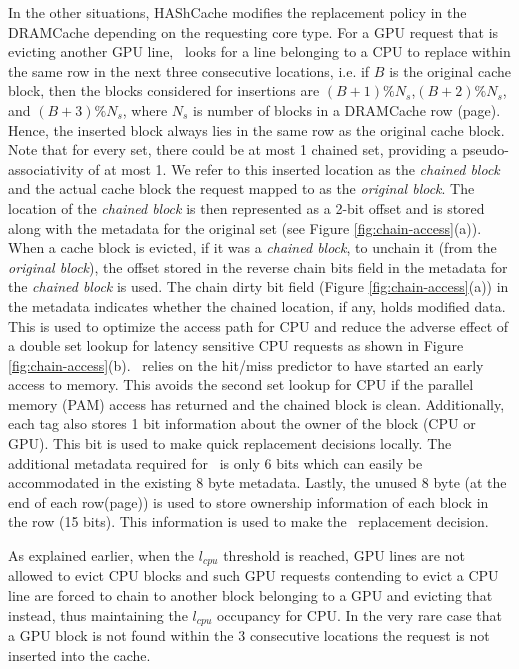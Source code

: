 
In the other situations, HAShCache modifies the replacement policy in the DRAMCache depending on the requesting core type. For a GPU request that is evicting another GPU line, \cachename\ looks for a line belonging to a CPU to replace within the same row in the next three consecutive locations,
i.e. if $B$ is the original cache block, then the blocks considered for insertions are $(B+1)\%N_s$,$(B+2)\%N_s$, and $(B+3)\%N_s$, where $N_s$ is number of blocks in a DRAMCache row (page). Hence, the inserted block always lies in the same row as the original cache block. Note that for every set, there could be at most 1 chained set, providing a pseudo-associativity of at most 1.  
We refer to this inserted location as the \textit{chained block} and the actual cache block the request mapped to as the \textit{original block}. The location of the \textit{chained block} is then represented as a 2-bit offset and is stored along with the metadata for the original set (see Figure \ref{fig:chain-access}(a)). When a cache block is evicted, if it was a \textit{chained block}, to unchain it (from the \textit{original block}), the offset stored in the reverse chain bits field in the metadata for the \textit{chained block} is used.  
The chain dirty bit field (Figure \ref{fig:chain-access}(a)) in the metadata indicates whether the chained location, if any, holds modified data. This is used to optimize the access path for CPU and reduce the adverse effect of a double set lookup for latency sensitive CPU requests as shown in Figure \ref{fig:chain-access}(b). \chaining\ relies on the hit/miss predictor to have started an early access to memory. This avoids the second set lookup for CPU if the parallel memory (PAM) access has returned and the chained block is clean. 
Additionally, each tag also stores 1 bit information about the owner of the block (CPU or GPU). This bit is used to make quick replacement decisions locally. The additional metadata required for \chaining\ is only 6 bits which can easily be accommodated in the existing 8 byte metadata. Lastly, the unused 8 byte (at the end of each row(page)) is used to store ownership information of each block in the row (15 bits). This information is used to make the \chaining\ replacement decision.

\par As explained earlier, when the \textit{$l_{cpu}$} threshold is reached, GPU lines are not allowed to evict CPU blocks and such GPU requests contending to evict a CPU line are forced to chain to another block belonging to a GPU and evicting that instead, thus maintaining the \textit{$l_{cpu}$} occupancy for CPU. In the very rare case that a GPU block is not found within the 3 consecutive locations the request is not inserted into the cache.

